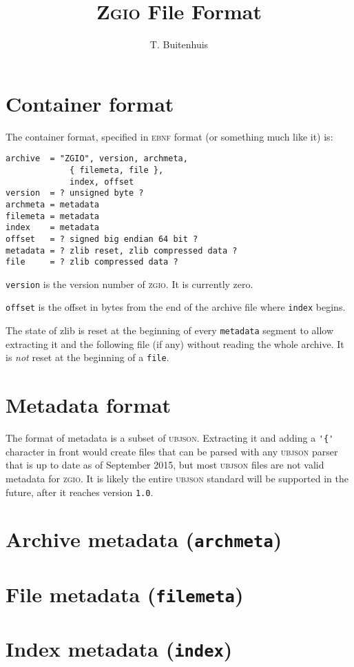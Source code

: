 \documentclass[a4paper]{article}
\title{\textsc{Zgio} File Format}
\author{T. Buitenhuis}
\begin{document}
\maketitle

\section{Container format}

The container format, specified in \textsc{ebnf} format\cite{ebnf} (or something much like it) is:

\begin{verbatim}
archive  = "ZGIO", version, archmeta,
             { filemeta, file },
             index, offset
version  = ? unsigned byte ?
archmeta = metadata
filemeta = metadata
index    = metadata
offset   = ? signed big endian 64 bit ?
metadata = ? zlib reset, zlib compressed data ?
file     = ? zlib compressed data ?
\end{verbatim}

\verb|version| is the version number of \textsc{zgio}.
It is currently zero.

\verb|offset| is the offset in bytes from the end of the archive file where \verb|index| begins.

The state of zlib is reset at the beginning of every \verb|metadata| segment to allow extracting it and the following file (if any) without reading the whole archive.
It is \emph{not} reset at the beginning of a \verb|file|.

\section{Metadata format}

The format of metadata is a subset of \textsc{ubjson}\cite{ubjson}.
Extracting it and adding a \verb|'{'| character in front would create files that can be parsed with any \textsc{ubjson} parser that is up to date as of September 2015,
but most \textsc{ubjson} files are not valid metadata for \textsc{zgio}.
It is likely the entire \textsc{ubjson} standard will be supported in the future,
after it reaches version \verb|1.0|.

\section{Archive metadata (\texttt{archmeta})}

\section{File metadata (\texttt{filemeta})}

\section{Index metadata (\texttt{index})}



\end{document}
